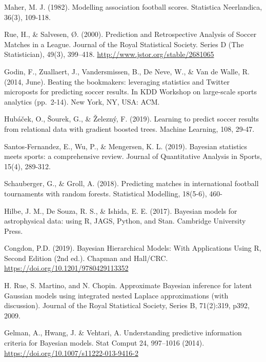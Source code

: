\documentclass[
]{article}
\begin{document}
Maher, M. J. (1982). Modelling association football scores. Statistica
Neerlandica, 36(3), 109-118.

Rue, H., \& Salvesen, Ø. (2000). Prediction and Retrospective Analysis
of Soccer Matches in a League. Journal of the Royal Statistical Society.
Series D (The Statistician), 49(3), 399--418.
\url{http://www.jstor.org/stable/2681065}

Godin, F., Zuallaert, J., Vandersmissen, B., De Neve, W., \& Van de
Walle, R. (2014, June). Beating the bookmakers: leveraging statistics
and Twitter microposts for predicting soccer results. In KDD Workshop on
large-scale sports analytics (pp.~2-14). New York, NY, USA: ACM.

Hubáček, O., Šourek, G., \& Železný, F. (2019). Learning to predict
soccer results from relational data with gradient boosted trees. Machine
Learning, 108, 29-47.

Santos-Fernandez, E., Wu, P., \& Mengersen, K. L. (2019). Bayesian
statistics meets sports: a comprehensive review. Journal of Quantitative
Analysis in Sports, 15(4), 289-312.

Schauberger, G., \& Groll, A. (2018). Predicting matches in
international football tournaments with random forests. Statistical
Modelling, 18(5-6), 460-

Hilbe, J. M., De Souza, R. S., \& Ishida, E. E. (2017). Bayesian models
for astrophysical data: using R, JAGS, Python, and Stan. Cambridge
University Press.

Congdon, P.D. (2019). Bayesian Hierarchical Models: With Applications
Using R, Second Edition (2nd ed.). Chapman and Hall/CRC.
\url{https://doi.org/10.1201/9780429113352}

H. Rue, S. Martino, and N. Chopin. Approximate Bayesian inference for
latent Gaussian models using integrated nested Laplace approximations
(with discussion). Journal of the Royal Statistical Society, Series B,
71(2):319, p392, 2009.

Gelman, A., Hwang, J. \& Vehtari, A. Understanding predictive
information criteria for Bayesian models. Stat Comput 24, 997--1016
(2014). \url{https://doi.org/10.1007/s11222-013-9416-2}
\end{document}
